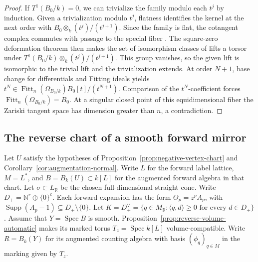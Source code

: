 \documentclass[11pt,reqno]{amsart}
\numberwithin{equation}{section}
\theoremstyle{definition}
\theoremstyle{remark}
\DeclareMathOperator{\Supp}{Supp}
\DeclareMathOperator{\Spec}{Spec}
\begin{document}
\begin{proof}
If \(T^1(B_0/k)=0\), we can trivialize the family modulo each \(t^j\)
by induction. Given a trivialization modulo \(t^j\), flatness identifies
the kernel at the next order with \(B_0\otimes_k(t^j)/(t^{j+1})\).
Since the family is flat, the cotangent complex commutes with passage
to the special fiber \cite[Lemma~92.6.2, Tag~08QQ]{Stacks}.
The square-zero deformation theorem \cite[Lemma~92.16.1, Tag~08SP]{Stacks}
then makes the set of isomorphism classes of lifts a torsor under
\(T^1(B_0/k)\otimes_k(t^j)/(t^{j+1})\). This group vanishes, so the
given lift is isomorphic to the trivial lift and the trivialization extends.
At order \(N+1\), base change for differentials and Fitting ideals yields
\(t^N\in\operatorname{Fitt}_n(\Omega_{B_0/k})B_0[t]/(t^{N+1})\).
Comparison of the \(t^N\)-coefficient forces
\(\operatorname{Fitt}_n(\Omega_{B_0/k})=B_0\). At a singular closed
point of this equidimensional fiber the Zariski tangent space has
dimension greater than \(n\), a contradiction.
\end{proof}

\subsection{The reverse chart of a smooth forward mirror}
\label{subsec:automatic-reverse-chart}

Let \(U\) satisfy the hypotheses of Proposition~\ref{prop:negative-vertex-chart}
and Corollary~\ref{cor:augmentation-normal}.
Write \(L\) for the forward label lattice, \(M=L^*\), and
\(B=B_k(U)\subset k[L]\) for the augmented forward algebra in that chart.
Let \(\sigma\subset L_{\mathbb R}\) be the chosen full-dimensional
straight cone. Write \(D_+=\mathbb N^r\oplus\{0\}^c\).
Each forward expansion has the form \(\Theta_p=z^p A_p\), with
\(\Supp(A_p-1)\subseteq D_+\setminus\{0\}\). Let
\(K=D_+^\vee=\{q\in M_{\mathbb R}:\langle q,d\rangle\ge0
\text{ for every }d\in D_+\}\). Assume that
\(Y=\Spec B\) is smooth. Proposition~\ref{prop:reverse-volume-automatic}
makes its marked torus \(T_z=\Spec k[L]\) volume-compatible. Write \(R=B_k(Y)\) for
its augmented counting algebra with basis \((\phi_q)_{q\in M}\)
in the marking given by \(T_z\).
\end{document}
